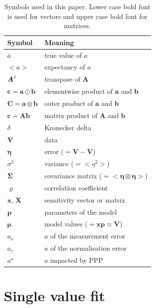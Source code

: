 \documentclass[twocolumn]{article}
\def\vec#1{\ensuremath{\boldsymbol{#1}}}
\def\tr#1{\ensuremath{{#1}^\text{\textsc{t}}}}
\def\expect#1{\ensuremath{ {<#1>} }}
\def\ppp#1{#1^\star}
\def\norm{_\tau}
\def\meas{_\nu}
\def\mean#1{\overline{#1}}
\let\outer=\otimes
\let\hadam=\odot
\def\data{\ensuremath{{\scriptstyle V}}}
\def\vdata{\ensuremath{\vec\data}}
\def\vdatamean{\ensuremath{\mean\vdata}}
\def\vmod{\ensuremath{\vec\mu}}
\def\error{\ensuremath{\eta}}
\def\verror{\ensuremath{\vec\error}}
\def\dev{\ensuremath{\sigma}}
\def\cov{\ensuremath{\Sigma}}
\def\vcov{\ensuremath{\vec\cov}}
\def\corr{\ensuremath{\varrho}}
\def\sens{\ensuremath{x}}
\def\vsens{\ensuremath{\vec\sens}}
\def\msens{\ensuremath{\vec X}}
\def\param{\ensuremath{p}}
\def\vparam{\ensuremath{\vec\param}}
\begin{document}
\begin{table}[t]
\caption{Symbols used in this paper. Lower case bold font is used for vectors and upper case bold font for matrices.}
\begin{tabular}{ll}
\hline\hline
Symbol               & Meaning\\
\hline
$\mean a$            & true value of $a$\\
$<a>$                & expectancy of $a$\\
$\tr{\vec A}$        & transpose of $\vec A$\\
$\vec c = \vec a\hadam\vec b$ & elementwise product of $\vec a$ and $\vec b$\\
$\vec C = \vec a\outer\vec b$ & outer product of $\vec a$ and $\vec b$\\
$\vec c = \vec A\vec b$       & matrix product of $\vec A$ and $\vec b$\\
$\delta$             & Kronecker delta\\
\hline
$\vdata$             & data\\ 
$\verror$            & error ($= \vdata - \vdatamean$)\\
$\dev^2$             & variance ($= \expect{\error^2}$)\\
$\vcov$              & covariance matrix ($= \expect{\verror\outer\verror}$)\\
$\corr$              & correlation coefficient\\
$\vsens$, $\msens$   & sensitivity vector or matrix\\
$\vparam$            & parameters of the model\\
$\vmod$              & model values ($= \vsens\vparam\approx\vdatamean$)\\
\hline
$a\meas$             & $a$ of the measurement error\\
$a\norm$             & $a$ of the normalisation error\\
$\ppp a$             & $a$ impacted by PPP\\
\hline
\end{tabular}
\end{table}

\section{Single value fit}
\end{document}
